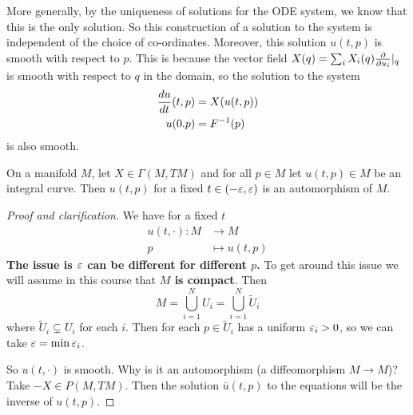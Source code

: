 More generally, by the uniqueness of solutions for the ODE system, we know that this is the only solution.
So this construction of a solution to the system is independent of the choice of co-ordinates.
Moreover, this solution $u(t,p)$ is smooth with respect to $p$.
This is because the vector field $X(q) = \sum_i X_i(q) \tfrac{\partial}{\partial u_i}|_q$ is smooth with respect to $q$ in the domain, so the solution to the system
\begin{align*}
  \frac{du}{dt}(t,p) &= X(u(t,p)) \\
  u(0.p) &= F^{-1}(p)
\end{align*}
is also smooth.

\begin{prop}
  On a manifold $M$, let $X \in \Gamma(M,TM)$ and for all $p \in M$ let $u(t,p) \in M$ be an integral curve.
  Then $u(t,p)$ for a fixed $t\in(-\varepsilon,\varepsilon)$ is an automorphism of $M$.
\end{prop}

\begin{proof}[Proof and clarification]
  We have for a fixed $t$
  \begin{align*}
    u(t,\cdot): M &\to M \\
    p &\mapsto u(t,p)
  \end{align*}
  \textbf{The issue is $\varepsilon$ can be different for different $p$.}
  To get around this issue we will assume in this course that \textbf{$M$ is compact}.
  Then
  \[ M = \bigcup_{i=1}^N U_i = \bigcup_{i=1}^N \tilde U_i \]
  where $\tilde U_i \subsetneq U_i$ for each $i$. %
  Then for each $p \in \tilde U_i$ has a uniform $\varepsilon_i>0$, so we can take $\varepsilon=\min\varepsilon_i$.

  So $u(t,\cdot)$ is smooth.
  Why is it an automorphism (a diffeomorphism $M \to M$)?
  Take $-X \in P(M,TM)$.
  Then the solution $\bar u(t,p)$ to the equations will be the inverse of $u(t,p)$.
\end{proof}


